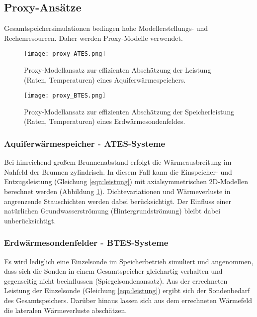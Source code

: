 \documentclass[12pt, a4paper, twoside, titlepage]{article}
\begin{document}
\subsection{Proxy-Ans\"atze}

Gesamtspeichersimulationen bedingen hohe Modellerstellungs- und Rechenresourcen. Daher werden Proxy-Modelle verwendet.

\begin{figure} [b!]
\centering
\texttt{[image: proxy\_ATES.png]}
\caption{Proxy-Modellansatz zur effizienten Absch\" atzung der Leistung (Raten, Temperaturen) eines Aquiferw\" armespeichers.}
\label{fig:proxy_ATES}
\end{figure}


\begin{figure} [b!]
\centering
\texttt{[image: proxy\_BTES.png]}
\caption{Proxy-Modellansatz zur effizienten Absch\" atzung der Speicherleistung (Raten, Temperaturen) eines Erdw\" armesondenfeldes.}
\label{fig:proxy_BTES}
\end{figure}



\subsubsection{Aquiferw\" armespeicher - ATES-Systeme}
%
Bei hinreichend gro\ss em Brunnenabstand erfolgt die W\" armeausbreitung im Nahfeld der Brunnen zylindrisch.
%
In diesem Fall kann die Einspeicher- und Entzugsleistung (Gleichung \ref{eqn:leistung})
mit axialsymmetrischen 2D-Modellen berechnet werden (Abbildung \ref{fig:proxy_ATES}). 
%
Dichtevariationen und W\" armeverluste in angrenzende Stauschichten werden dabei ber\" ucksichtigt.
%
Der Einfluss einer nat\" urlichen Grundwasserstr\" omung (Hintergrundstr\" omung) bleibt dabei unber\" ucksichtigt.

\subsubsection{Erdw\" armesondenfelder - BTES-Systeme}
%
Es wird lediglich eine Einzelsonde im Speicherbetrieb simuliert und angenommen, dass sich die Sonden in einem Gesamtspeicher gleichartig verhalten und gegenseitig nicht beeinflussen (Spiegelsondenansatz).
%
Aus der errechneten Leistung der Einzelsonde (Gleichung \ref{eqn:leistung}) ergibt sich der Sondenbedarf des Gesamtspeichers.
%
Dar\" uber hinaus lassen sich aus dem errechneten W\" armefeld die lateralen W\" armeverluste absch\" atzen.
\end{document}
